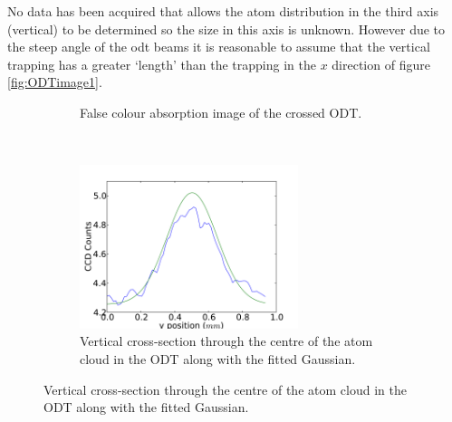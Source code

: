 No data has been acquired that allows the atom distribution in the third axis (vertical) to be determined so the size in this axis is unknown. However due to the steep angle of the \gls{odt} beams it is reasonable to assume that the vertical trapping has a greater `length' than the trapping in the $x$ direction of figure \ref{fig:ODTimage1}.

\begin{figure}[h]
\centering
    \begin{subfigure}[b]{0.5\textwidth}\centering
{}
        \caption{False colour absorption image of the crossed ODT.}
    \end{subfigure}~~~\begin{subfigure}[b]{0.5\textwidth}\centering
\includegraphics[width=0.7\textwidth]{figs/ODTimage1y.pdf}
        \caption{Vertical cross-section through the centre of the atom cloud in the ODT along with the fitted Gaussian.}
    \end{subfigure}



\end{figure}
